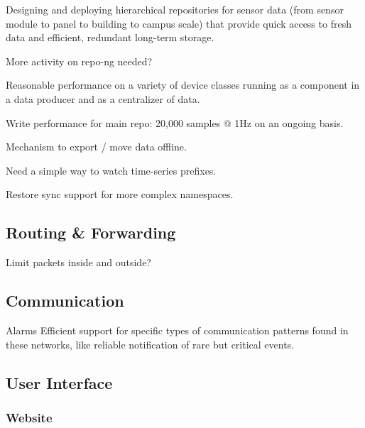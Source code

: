Designing and deploying hierarchical repositories for sensor data (from sensor module to panel to building to campus scale) that provide quick access to fresh data and efficient, redundant long-term storage. 

More activity on repo-ng needed? 

Reasonable performance on a variety of device classes  running as a component in a data producer and as a centralizer of data. 

Write performance for main repo:  20,000 samples @ 1Hz on an ongoing basis.  

Mechanism to export / move data offline. 

Need a simple way to watch time-series prefixes. 

Restore sync support for more complex namespaces. 

\subsection{Routing \& Forwarding}

Limit packets inside and outside? 

\subsection{Communication}
Alarms
Efficient support for specific types of communication patterns found in these networks, like reliable notification of rare but critical events. 


\subsection{User Interface}
\subsubsection{Website}
